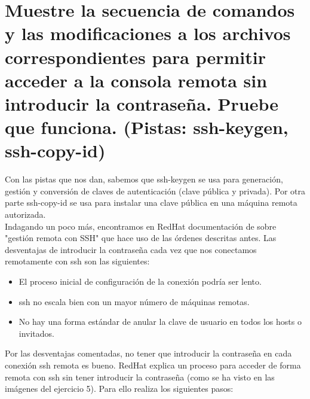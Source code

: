 	
	
	\section{Muestre la secuencia de comandos y las modificaciones a los archivos correspondientes para permitir acceder a la consola remota sin introducir la contraseña. Pruebe que funciona. (Pistas: ssh-keygen, ssh-copy-id)}
	
	Con las pistas que nos dan, sabemos que ssh-keygen\cite{ejercicio6-1} se usa para generación, gestión y conversión de claves de autenticación (clave pública y privada). Por otra parte ssh-copy-id\cite{ejercicio6-2} se usa para instalar una clave pública en una máquina remota autorizada.
	\\
	
	Indagando un poco más, encontramos en RedHat documentación de sobre "gestión remota con SSH" que hace uso de las órdenes descritas antes. Las desventajas de introducir la contraseña cada vez que nos conectamos remotamente con ssh son las siguientes: 
	\begin{itemize}
		\item El proceso inicial de configuración de la conexión podría ser lento.
		\item ssh no escala bien con un mayor número de máquinas remotas.
		\item No hay una forma estándar de anular la clave de usuario en todos los hosts o invitados.
	\end{itemize}
	
	Por las desventajas comentadas, no tener que introducir la contraseña en cada conexión ssh remota es bueno. RedHat explica un proceso para acceder de forma remota con ssh sin tener introducir la contraseña (como se ha visto en las imágenes del ejercicio 5). Para ello realiza los siguientes pasos:
	
